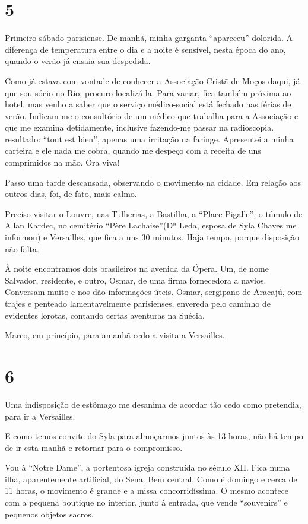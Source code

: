\section*{5 \adfflatleafright {}}
Primeiro sábado parisiense. De manhã, minha garganta “apareceu” dolorida. A diferença de temperatura entre o dia e a noite é sensível, nesta época do ano, quando o verão já ensaia sua despedida.

Como já estava com vontade de conhecer a Associação Cristã de Moços daqui, já que sou sócio no Rio, procuro localizá-la. Para variar, fica também próxima ao hotel, mas venho a saber que o serviço médico-social está fechado nas férias de verão. Indicam-me o consultório de um médico que trabalha para a Associação e que me examina detidamente, inclusive fazendo-me passar na radioscopia. resultado: “tout est bien”, apenas uma irritação na faringe. Apresentei a minha carteira e ele nada me cobra, quando me despeço com a receita de uns comprimidos na mão. Ora viva!

Passo uma tarde descansada, observando o movimento na cidade. Em relação aos outros dias, foi, de fato, mais calmo.

Preciso visitar o Louvre, nas Tulherias, a Bastilha, a “Place Pigalle”, o túmulo de Allan Kardec, no cemitério “Père Lachaise”(Dª Leda, esposa de Syla Chaves me informou) e Versailles, que fica a uns 30 minutos. Haja tempo, porque disposição não falta.

À noite encontramos dois brasileiros na avenida da Ópera. Um, de nome Salvador, residente, e outro, Osmar, de uma firma fornecedora a navios. Conversam muito e nos dão informações úteis. Osmar, sergipano de Aracajú, com trajes e penteado lamentavelmente parisienses, envereda pelo caminho de evidentes lorotas, contando certas aventuras na Suécia.

Marco, em princípio, para amanhã cedo a visita a Versailles.

\section*{6 \adfflatleafright {}}
Uma indisposição de estômago me desanima de acordar tão cedo como pretendia, para ir a Versailles.

E como temos convite do Syla para almoçarmos juntos às 13 horas, não há tempo de ir esta manhã e retornar para o compromisso.

Vou à “Notre Dame”, a portentosa igreja construída no século XII. Fica numa ilha, aparentemente artificial, do Sena. Bem central. Como é domingo e cerca de 11 horas, o movimento é grande e a missa concorridíssima. O mesmo acontece com a pequena boutique no interior, junto à entrada, que vende “souvenirs” e pequenos objetos sacros.

